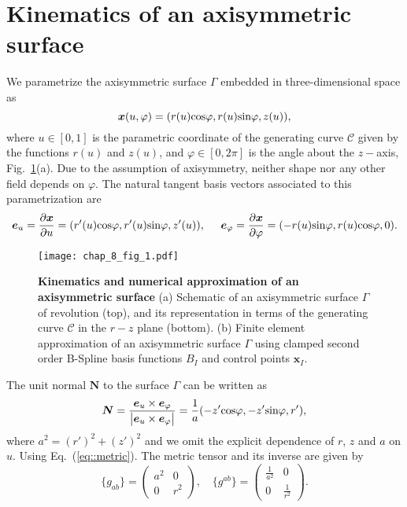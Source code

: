 \section{Kinematics of an axisymmetric surface} \label{2_3_1}

We parametrize the axisymmetric surface $\Gamma$ embedded in three-dimensional space as 
\begin{equation}  \label{1_III}
    \bm{x}(u,\varphi) = (r(u)\textup{cos} \varphi, r(u) \textup{sin} \varphi, z(u)),
\end{equation}
where $u \in [0,1]$ is the parametric coordinate of the generating curve $\mathcal{C}$ given by the functions $r(u)$ and $z(u)$, and $\varphi \in [0,2\pi]$ is the angle about the $z-$axis, Fig.~\ref{fig_2}(a).  Due to the assumption of axisymmetry, neither shape nor any other field depends on $\varphi$.  The natural tangent basis vectors associated to this parametrization are
\begin{equation} \label{2_III}
    \bm{e}_{u} = \frac{\partial \bm{x}}{\partial u} = (r'(u)\textup{cos} \varphi, r'(u) \textup{sin} \varphi, z'(u)), \;\;\;\;\;
    \bm{e}_{\varphi} = \frac{\partial \bm{x}}{\partial \varphi} = (-r(u)\textup{sin} \varphi, r(u) \textup{cos} \varphi, 0).
\end{equation}
\begin{figure}
\centering
\texttt{[image: chap\_8\_fig\_1.pdf]}
\caption{ \textbf{Kinematics and numerical approximation of an axisymmetric surface} (a) Schematic of an axisymmetric surface $\Gamma$ of revolution (top), and its representation in terms of the generating curve $\mathcal{C}$ in the $r-z$ plane (bottom). (b) Finite element approximation of an axisymmetric surface $\Gamma$ using clamped second order B-Spline basis functions $B_{I}$ and control points $\bm{x}_I$. }
\label{fig_2}
\end{figure} 
The unit normal $\bm{N}$ to the surface $\Gamma$ can be written as
\begin{equation} \label{4_III}
    \bm{N} = \frac{\bm{e}_u \times \bm{e}_\varphi}{\left|\bm{e}_u \times \bm{e}_\varphi \right|}= \frac{1}{a}(-z' \textup{cos}\varphi , -z' \textup{sin}\varphi, r'),
\end{equation}
where $a^2 = (r')^2 + (z')^2$ and we omit the explicit dependence of
$r$, $z$ and $a$ on $u$. Using Eq.~(\ref{eq::metric}). The metric tensor and its inverse are given by
\begin{equation} \label{5_III}
\{g_{ab} \} = \begin{pmatrix}
a^2 & 0 \\ 
0 & r^2 
\end{pmatrix} , \quad  \{g^{ab} \} = \begin{pmatrix}
\frac{1}{a^2} & 0 \\ 
0 & \frac{1}{r^2} 
\end{pmatrix}.
\end{equation}

